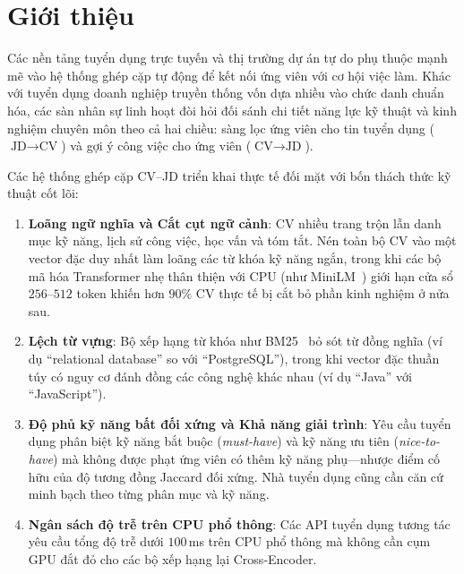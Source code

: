 \section{Giới thiệu}

Các nền tảng tuyển dụng trực tuyến và thị trường dự án tự do phụ thuộc mạnh mẽ vào hệ thống ghép cặp tự động để kết nối ứng viên với cơ hội việc làm. Khác với tuyển dụng doanh nghiệp truyền thống vốn dựa nhiều vào chức danh chuẩn hóa, các sàn nhân sự linh hoạt đòi hỏi đối sánh chi tiết năng lực kỹ thuật và kinh nghiệm chuyên môn theo cả hai chiều: sàng lọc ứng viên cho tin tuyển dụng ($\text{JD} \rightarrow \text{CV}$) và gợi ý công việc cho ứng viên ($\text{CV} \rightarrow \text{JD}$).

Các hệ thống ghép cặp CV--JD triển khai thực tế đối mặt với bốn thách thức kỹ thuật cốt lõi:
\begin{enumerate}
    \item \textbf{Loãng ngữ nghĩa và Cắt cụt ngữ cảnh}: CV nhiều trang trộn lẫn danh mục kỹ năng, lịch sử công việc, học vấn và tóm tắt. Nén toàn bộ CV vào một vector đặc duy nhất làm loãng các từ khóa kỹ năng ngắn, trong khi các bộ mã hóa Transformer nhẹ thân thiện với CPU (như MiniLM~\cite{reimers2019sentencebert}) giới hạn cửa sổ $256$--$512$ token khiến hơn $90\%$ CV thực tế bị cắt bỏ phần kinh nghiệm ở nửa sau.
    \item \textbf{Lệch từ vựng}: Bộ xếp hạng từ khóa như BM25~\cite{robertson2009probabilistic} bỏ sót từ đồng nghĩa (ví dụ ``relational database'' so với ``PostgreSQL''), trong khi vector đặc thuần túy có nguy cơ đánh đồng các công nghệ khác nhau (ví dụ ``Java'' với ``JavaScript'').
    \item \textbf{Độ phủ kỹ năng bất đối xứng và Khả năng giải trình}: Yêu cầu tuyển dụng phân biệt kỹ năng bắt buộc (\textit{must-have}) và kỹ năng ưu tiên (\textit{nice-to-have}) mà không được phạt ứng viên có thêm kỹ năng phụ---nhược điểm cố hữu của độ tương đồng Jaccard đối xứng. Nhà tuyển dụng cũng cần căn cứ minh bạch theo từng phân mục và kỹ năng.
    \item \textbf{Ngân sách độ trễ trên CPU phổ thông}: Các API tuyển dụng tương tác yêu cầu tổng độ trễ dưới $100$\,ms trên CPU phổ thông mà không cần cụm GPU đắt đỏ cho các bộ xếp hạng lại Cross-Encoder.
\end{enumerate}

